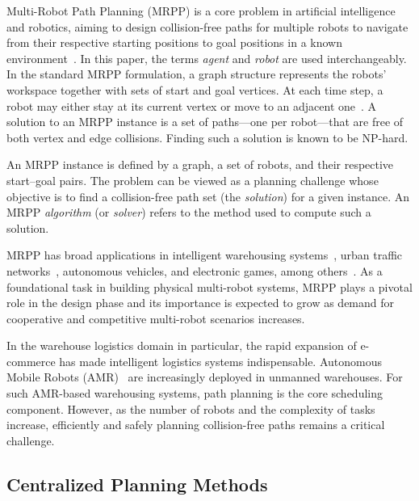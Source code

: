\documentclass[conference]{IEEEtran}
\begin{document}
Multi-Robot Path Planning (MRPP) is a core problem in artificial
intelligence and robotics, aiming to design collision-free paths
for multiple robots to navigate from their respective starting
positions to goal positions in a known environment~\cite{wang2023scrimp}.
In this paper, the terms \emph{agent} and \emph{robot} are used
interchangeably.
In the standard MRPP formulation, a graph structure represents the
robots' workspace together with sets of start and goal
vertices.
At each time step, a robot may either stay at its current vertex
or move to an adjacent one~\cite{li2021lifelong}.
A solution to an MRPP instance is a set of paths—one per robot—that
are free of both vertex and edge collisions.
Finding such a solution is known to be NP-hard.

An MRPP instance is defined by a graph, a set of robots, and their
respective start–goal pairs.
The problem can be viewed as a planning challenge whose objective
is to find a collision-free path set (the \emph{solution}) for a
given instance.
An MRPP \emph{algorithm} (or \emph{solver}) refers to the method
used to compute such a solution.

MRPP has broad applications in intelligent warehousing
systems~\cite{zhang2023warehouse}, urban traffic
networks~\cite{dresner2008multiagent}, autonomous
vehicles, and electronic games, among
others~\cite{ma2022graph}.
As a foundational task in building physical multi-robot systems,
MRPP plays a pivotal role in the design phase and its importance
is expected to grow as demand for cooperative and competitive
multi-robot scenarios increases.


In the warehouse logistics domain in particular, the rapid
expansion of e-commerce has made intelligent logistics systems
indispensable.
Autonomous Mobile Robots (AMR)~\cite{tamura2025human} are
increasingly deployed in unmanned warehouses.
For such AMR-based warehousing systems, path planning is the core
scheduling component.
However, as the number of robots and the complexity of tasks
increase, efficiently and safely planning collision-free paths
remains a critical challenge.

\subsection{Centralized Planning Methods}
\end{document}

